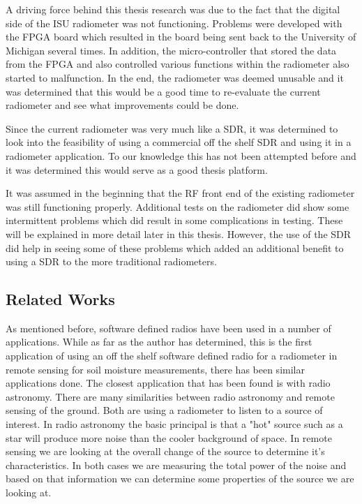 A driving force behind this thesis research was due to the fact that the digital side of the ISU radiometer was not functioning.  Problems were developed with the FPGA board which resulted in the board being sent back to the University of Michigan several times.  In addition, the micro-controller that stored the data from the FPGA and also controlled various functions within the radiometer also started to malfunction.  In the end, the radiometer was deemed unusable and it was determined that this would be a good time to re-evaluate the current radiometer and see what improvements could be done.  

Since the current radiometer was very much like a SDR, it was determined to look into the feasibility of using a commercial off the shelf SDR and using it in a radiometer application.  To our knowledge this has not been attempted before and it was determined this would serve as a good thesis platform.

It was assumed in the beginning that the RF front end of the existing radiometer was still functioning properly.  Additional tests on the radiometer did show some intermittent problems which did result in some complications in testing.  These will be explained in more detail later in this thesis.  However, the use of the SDR did help in seeing some of these problems which added an additional benefit to using a SDR to the more traditional radiometers.  


\subsection{Related Works}
As mentioned before, software defined radios have been used in a number of applications.  While as far as the author has determined, this is the first application of using an off the shelf software defined radio for a radiometer in remote sensing for soil moisture measurements, there has been similar applications done.  The closest application that has been found is with radio astronomy.  There are many similarities between radio astronomy and remote sensing of the ground.  Both are using a radiometer to listen to a source of interest.  In radio astronomy the basic principal is that a "hot" source such as a star will produce more noise than the cooler background of space.  In remote sensing we are looking at the overall change of the source to determine it's characteristics.  In both cases we are measuring the total power of the noise and based on that information we can determine some properties of the source we are looking at.

